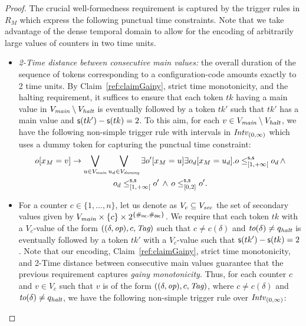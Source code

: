 \begin{proof}
The crucial well-formedness requirement is captured by the trigger rules in $R_M$ which express the following punctual time constraints.
Note that we take advantage of the dense temporal domain to allow
for the encoding of arbitrarily large values of counters in two time units.
 \begin{itemize}
   \item \emph{2-Time distance between consecutive main values:} the overall duration of the sequence of tokens corresponding to a configuration-code  amounts exactly to 2 time units. %
By Claim~\ref{ref:claimGainy}, strict time monotonicity, and the halting requirement, it suffices to ensure that each token $tk$ having a  main value in $V_{\textit{main}} \setminus V_{\textit{halt}}$ is eventually followed by a token $tk'$  such that $tk'$ has a  main value and $\mathsf{s}(tk')-\mathsf{s}(tk)=2$. To this aim, for each  $v\in V_{\textit{main}} \setminus V_{\textit{halt}}$,  we have the following non-simple trigger rule with intervals in ${\mathit{Intv}}_{(0,\infty)}$ which uses a dummy token for capturing the punctual time constraint:
%
\begin{multline*}
o[x_M=v] \rightarrow \bigvee_{u\in V_{\textit{main}}}\bigvee_{u_d\in V_{\textit{dummy}}} \exists  o'[x_M= u]\exists  o_d[x_M= u_d].  o\leq^{\mathsf{s},\mathsf{s}}_{[1,+\infty[} o_d \,\wedge\\ o_d\leq^{\mathsf{s},\mathsf{s}}_{[1,+\infty[}o'\, \wedge\, o\leq^{\mathsf{s},\mathsf{s}}_{[0,2]} o'.
\end{multline*}
   \item 
   For a counter $c\in \{1,\ldots,n\}$, let us denote as $V_c\subseteq V_{\textit{sec}}$ the set of secondary values given
    by $V_{\textit{main}} \times \{c\} \times 2^{\{\#_{\mathsf{inc}},\#_{\mathsf{dec}}\}}$. We require that  each token $tk$  with
    a $V_{c}$-value of the form $((\delta,{\textit{op}}),c,{\textit{Tag}})$  such that $c\neq c(\delta)$ and ${\textit{to}}(\delta)\neq q_{\textit{halt}}$ is eventually followed by a token $tk'$ with a $V_{c}$-value such that  $\mathsf{s}(tk')-\mathsf{s}(tk)=2$.
Note that our encoding, Claim~\ref{ref:claimGainy}, strict time monotonicity, and 2-Time distance between consecutive main values guarantee  that the previous requirement captures \emph{gainy monotonicity}.
 Thus, for each counter $c$ and $v\in V_{c}$ such that $v$ is of the form $((\delta,{\textit{op}}),c,{\textit{Tag}})$, where $c\neq c(\delta)$ and ${\textit{to}}(\delta)\neq q_{\textit{halt}}$, we have the following non-simple trigger rule over ${\mathit{Intv}}_{(0,\infty)}$:\\

\end{itemize}
\end{proof}
